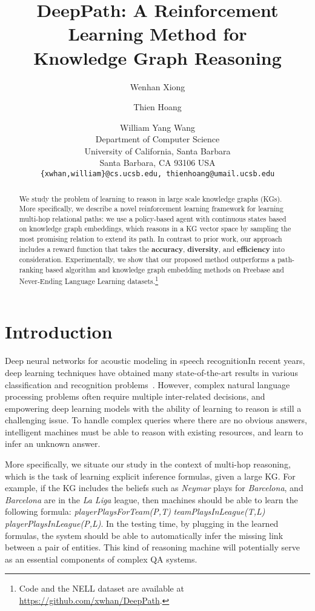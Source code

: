 \documentclass[11pt,letterpaper]{article}
\title{DeepPath: A Reinforcement Learning Method for\\ Knowledge Graph Reasoning}
\author{Wenhan Xiong \and Thien Hoang \and  William Yang Wang\\
   Department of Computer Science\\
   University of California, Santa Barbara\\
   Santa Barbara, CA 93106 USA\\
  {\tt \{xwhan,william\}@cs.ucsb.edu, thienhoang@umail.ucsb.edu}}
\date{}
\begin{document}
\maketitle
\begin{abstract}
We study the problem of learning to reason in large scale knowledge graphs (KGs). More specifically, we describe a novel reinforcement learning framework for learning multi-hop relational paths: we use a policy-based agent with continuous states based on knowledge graph embeddings, which reasons in a KG vector space by sampling the most promising relation to extend its path. In contrast to prior work, our approach includes a reward function that takes the \textbf{accuracy}, \textbf{diversity}, and \textbf{efficiency} into consideration. Experimentally, we show that our proposed method outperforms a path-ranking based algorithm and knowledge graph embedding methods on Freebase and Never-Ending Language Learning datasets.\footnote{Code and the NELL dataset are available at \url{https://github.com/xwhan/DeepPath}.}
\end{abstract}


\section{Introduction}

Deep neural networks for acoustic modeling in speech recognitionIn recent years, deep learning techniques have obtained many state-of-the-art results in various classification and recognition problems~\cite{krizhevsky2012imagenet,hinton2012deep,kim2014convolutional}. However, complex natural language processing problems often require multiple inter-related decisions, and empowering deep learning models with the ability of learning to reason is still a challenging issue.  To handle complex queries where there are no obvious answers, intelligent machines must be able to reason with existing resources, and learn to infer an unknown answer. 

More specifically, we situate our study in the context of multi-hop reasoning, which is the task of learning explicit inference formulas, given a large KG. For example, if the KG includes the beliefs such as \emph{Neymar} plays for \emph{Barcelona}, and \emph{Barcelona} are in the \emph{La Liga} league, then machines should be able to learn the following formula: 
\emph{playerPlaysForTeam(P,T)}  \emph{teamPlaysInLeague(T,L)}  \emph{playerPlaysInLeague(P,L)}.
In the testing time, by plugging in the learned formulas, the system should be able to automatically infer the missing link between a pair of entities. This kind of reasoning machine will potentially serve as an essential components of complex QA systems.
\end{document}
